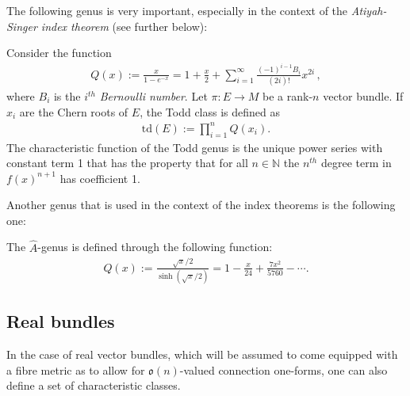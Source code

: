     The following genus is very important, especially in the context of the \textit{Atiyah-Singer index theorem} (see further below):
    \begin{example}\label{bundle:todd_class}
        Consider the function
        \begin{gather}
            Q(x) := \frac{x}{1-e^{-x}} = 1 + \frac{x}{2} + \sum_{i=1}^\infty\frac{(-1)^{i-1}B_i}{(2i)!}x^{2i}\,,
        \end{gather}
        where $B_i$ is the $i^{th}$ \textit{Bernoulli number}. Let $\pi:E\rightarrow M$ be a rank-$n$ vector bundle. If $x_i$ are the Chern roots of $E$, the Todd class is defined as
        \begin{gather}
            \mathrm{td}(E) := \prod_{i=1}^nQ(x_i).
        \end{gather}
        The characteristic function of the Todd genus is the unique power series with constant term 1 that has the property that for all $n\in\mathbb{N}$ the $n^{th}$ degree term in $f(x)^{n+1}$ has coefficient 1.
    \end{example}
    Another genus that is used in the context of the index theorems is the following one:
    \begin{example}\label{bundle:a_roof_genus}
        The $\hat{A}$-genus is defined through the following function:
        \begin{gather}
            Q(x) := \frac{\sqrt{x}/2}{\sinh(\sqrt{x}/2)} = 1 - \frac{x}{24} + \frac{7x^2}{5760} - \cdots.
        \end{gather}
    \end{example}

\subsection{Real bundles}

    In the case of real vector bundles, which will be assumed to come equipped with a fibre metric as to allow for $\mathfrak{o}(n)$-valued connection one-forms, one can also define a set of characteristic classes.


